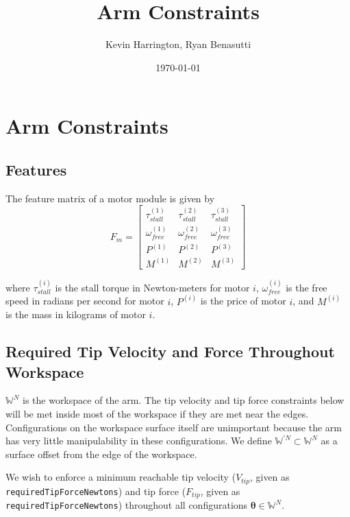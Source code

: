 \documentclass{article}
\title{Arm Constraints}
\author{Kevin Harrington, Ryan Benasutti}
\date{\today}
\begin{document}
\maketitle

\FloatBarrier
\section{Arm Constraints}

\FloatBarrier
\subsection{Features}

The feature matrix of a motor module is given by
\begin{equation}
    F_m =
    \begin{bmatrix}
        \tau_{stall}^{(1)} & \tau_{stall}^{(2)} & \tau_{stall}^{(3)} \\[6pt]
        \omega_{free}^{(1)} & \omega_{free}^{(2)} & \omega_{free}^{(3)} \\[6pt]
        P^{(1)} & P^{(2)} & P^{(3)} \\[6pt]
        M^{(1)} & M^{(2)} & M^{(3)}
    \end{bmatrix}
\end{equation}

where $\tau_{stall}^{(i)}$ is the stall torque in Newton-meters for motor $i$, $\omega_{free}^{(i)}$
is the free speed in radians per second for motor $i$, $P^{(i)}$ is the price of motor $i$, and
$M^{(i)}$ is the mass in kilograms of motor $i$.

\FloatBarrier
\subsection{Required Tip Velocity and Force Throughout Workspace}

$\mathbb{W}^N$ is the workspace of the arm. The tip velocity and tip force
constraints below will be met inside most of the workspace if they are met near
the edges. Configurations on the workspace surface itself are unimportant
because the arm has very little manipulability in these configurations. We
define $\mathbb{W}^{\prime N} \subset \mathbb{W}^N$ as a surface offset from
the edge of the workspace.

We wish to enforce a minimum reachable tip velocity ($V_{tip}$, given as
\texttt{requiredTipForceNewtons}) and tip force ($F_{tip}$, given as
\texttt{requiredTipForceNewtons}) throughout all configurations $\boldsymbol{\theta} \in
\mathbb{W}^N$.
\end{document}
